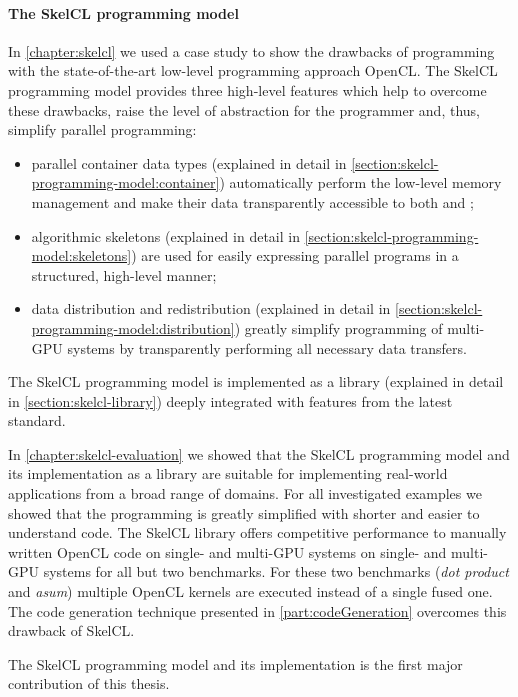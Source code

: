 \paragraph{The SkelCL programming model}
In \autoref{chapter:skelcl} we used a case study to show the drawbacks of programming with the state-of-the-art low-level programming approach OpenCL.
The SkelCL programming model provides three high-level features which help to overcome these drawbacks, raise the level of abstraction for the programmer and, thus, simplify parallel programming:
\begin{itemize}
  \item parallel container data types (explained in detail in \autoref{section:skelcl-programming-model:container}) automatically perform the low-level memory management and make their data transparently accessible to both \CPU and \GPUs;
  \item algorithmic skeletons (explained in detail in \autoref{section:skelcl-programming-model:skeletons}) are used for easily expressing parallel programs in a structured, high-level manner;
  \item data distribution and redistribution (explained in detail in \autoref{section:skelcl-programming-model:distribution}) greatly simplify programming of multi-GPU systems by transparently performing all necessary data transfers.
\end{itemize}

\noindent
The SkelCL programming model is implemented as a \Cpp library (explained in detail in \autoref{section:skelcl-library}) deeply integrated with features from the latest \Cpp standard.

In \autoref{chapter:skelcl-evaluation} we showed that the SkelCL programming model and its implementation as a \Cpp library are suitable for implementing real-world applications from a broad range of domains.
For all investigated examples we showed that the programming is greatly simplified with shorter and easier to understand code.
The SkelCL library offers competitive performance to manually written OpenCL code on single- and multi-GPU systems on single- and multi-GPU systems for all but two benchmarks.
For these two benchmarks (\emph{dot product} and \emph{asum}) multiple OpenCL kernels are executed instead of a single fused one.
The code generation technique presented in \autoref{part:codeGeneration} overcomes this drawback of SkelCL.

\bigskip
The SkelCL programming model and its implementation is the first major contribution of this thesis.

